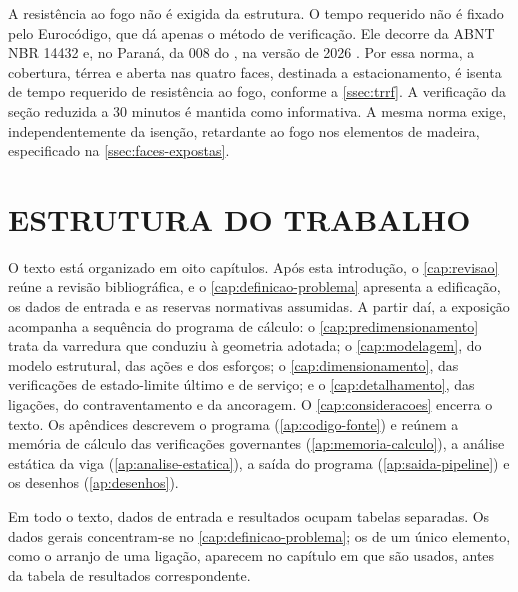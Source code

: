 A resistência ao fogo não é exigida da estrutura. O tempo requerido não é
fixado pelo Eurocódigo, que dá apenas o método de verificação. Ele decorre da
ABNT NBR 14432 \cite{NBR14432:2001} e, no Paraná, da  008 do
, na versão de 2026
\cite{CBMPR-NPT008:2026}. Por essa norma,
a cobertura, térrea e aberta nas quatro faces, destinada a estacionamento, é
isenta de tempo requerido de resistência ao fogo, conforme a
\autoref{ssec:trrf}. A verificação da seção reduzida a 30 minutos é mantida como
informativa. A mesma norma exige, independentemente da isenção, retardante ao fogo
nos elementos de madeira, especificado na \autoref{ssec:faces-expostas}.

\section{ESTRUTURA DO TRABALHO}\label{sec:estrutura-trabalho}

O texto está organizado em oito capítulos. Após esta introdução, o
\autoref{cap:revisao} reúne a revisão bibliográfica, e o
\autoref{cap:definicao-problema} apresenta a edificação, os dados de entrada e as
reservas normativas assumidas. A partir daí, a exposição acompanha a sequência
do programa de cálculo: o \autoref{cap:predimensionamento} trata da varredura
que conduziu à geometria adotada; o \autoref{cap:modelagem}, do modelo
estrutural, das ações e dos esforços; o \autoref{cap:dimensionamento}, das
verificações de estado-limite último e de serviço; e o
\autoref{cap:detalhamento}, das ligações, do contraventamento e da ancoragem. O
\autoref{cap:consideracoes} encerra o texto. Os apêndices descrevem o programa
(\autoref{ap:codigo-fonte}) e reúnem a memória de cálculo das verificações
governantes (\autoref{ap:memoria-calculo}), a análise estática da viga
(\autoref{ap:analise-estatica}), a saída do programa
(\autoref{ap:saida-pipeline}) e os desenhos (\autoref{ap:desenhos}).

Em todo o texto, dados de entrada e resultados ocupam tabelas separadas. Os
dados gerais concentram-se no \autoref{cap:definicao-problema}; os de um único
elemento, como o arranjo de uma ligação, aparecem no capítulo em que são usados,
antes da tabela de resultados correspondente.
